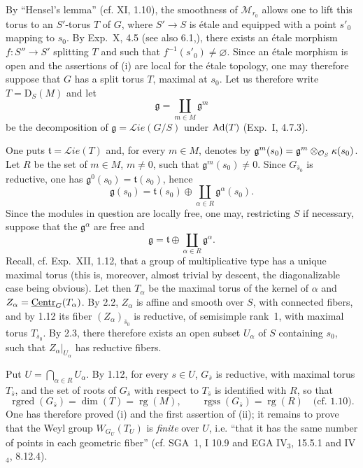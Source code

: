 By ``Hensel's lemma'' (cf. XI, 1.10), the smoothness of $\mathcal M_{r_0}$ allows one to lift this torus to an $S'$-torus $T$ of $G$, where $S'\to S$ is \'etale and equipped with a point $s'_0$ mapping to $s_0$. By Exp.~X, 4.5 (see also 6.1,{\renewcommand{\thefootnote}{(22)}}), there exists an \'etale morphism $f:S''\to S'$ splitting $T$ and such that $f^{-1}(s'_0)\ne\varnothing$. Since an \'etale morphism is open and the assertions of (i) are local for the \'etale topology, one may therefore suppose that $G$ has a split torus $T$,{\renewcommand{\thefootnote}{(23)}} maximal at $s_0$. Let us therefore write $T=\mathrm D_S(M)$ and let
\[
\mathfrak g=\coprod_{m\in M}\mathfrak g^m
\]
be the decomposition of $\mathfrak g=\mathcal{L}\!ie(G/S)$ under $\operatorname{Ad}(T)$ (Exp.~I, 4.7.3).

One puts $\mathfrak t=\mathcal{L}\!ie(T)$ and, for every $m\in M$, denotes by $\mathfrak g^m(s_0)=\mathfrak g^m\otimes_{\mathcal{O}_S}\kappa(s_0)$.{\renewcommand{\thefootnote}{(24)}} Let $R$ be the set of $m\in M$, $m\ne0$, such that $\mathfrak g^m(s_0)\ne0$.{\renewcommand{\thefootnote}{(25)}} Since $G_{\overline{s}_0}$ is reductive, one has $\mathfrak g^0(s_0)=\mathfrak t(s_0)$, hence
\[
\mathfrak g(s_0)=\mathfrak t(s_0)\oplus\coprod_{\alpha\in R}\mathfrak g^\alpha(s_0).
\]
Since the modules in question are locally free, one may, restricting $S$ if necessary, suppose that the $\mathfrak g^\alpha$ are free and
\[
\mathfrak g=\mathfrak t\oplus\coprod_{\alpha\in R}\mathfrak g^\alpha.
\]
Recall, cf. Exp.~XII, 1.12, that a group of multiplicative type has a unique maximal torus (this is, moreover, almost trivial by descent, the diagonalizable case being obvious). Let then $T_\alpha$ be the maximal torus of the kernel of $\alpha$ and $Z_\alpha=\underline{\mathrm{Centr}}_G(T_\alpha)$.{\renewcommand{\thefootnote}{(26)}} By 2.2, $Z_\alpha$ is affine and smooth over $S$, with connected fibers, and by 1.12 its fiber $(Z_\alpha)_{\overline{s}_0}$ is reductive, of semisimple rank~1, with maximal torus $T_{\overline{s}_0}$. By 2.3, there therefore exists an open subset $U_\alpha$ of $S$ containing $s_0$, such that $Z_\alpha|_{U_\alpha}$ has reductive fibers.

Put $U=\bigcap_{\alpha\in R}U_\alpha$. By 1.12, for every $s\in U$, $G_{\overline{s}}$ is reductive, with maximal torus $T_{\overline{s}}$, and the set of roots of $G_{\overline{s}}$ with respect to $T_{\overline{s}}$ is identified with $R$, so that
\[
\operatorname{rgred}(G_{\overline{s}})=\dim(T)=\operatorname{rg}(M),\qquad
\operatorname{rgss}(G_{\overline{s}})=\operatorname{rg}(R)\quad\text{(cf. 1.10).}
\]
One has therefore proved (i) and the first assertion of (ii); it remains to prove that the Weyl group $W_{G_U}(T_U)$ is \emph{finite} over $U$, i.e. ``that it has the same number of points in each geometric fiber'' (cf. SGA~1, I 10.9 and EGA IV$_3$, 15.5.1 and IV$_4$, 8.12.4).

